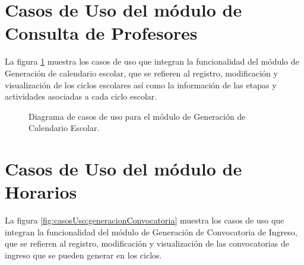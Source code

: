 \section{Casos de Uso del módulo de Consulta de Profesores}

La figura \ref{fig:casosUso:generacionCalendario} muestra los casos de uso que integran la funcionalidad del módulo de Generación de calendario escolar, que se refieren al registro, modificación y visualización de los ciclos escolares así como la información de las etapas y actividades asociadas a cada ciclo escolar.

\begin{figure}[h!]
	\begin{center}
		\caption{Diagrama de casos de uso para el módulo de Generación de Calendario Escolar. \label{fig:casosUso:generacionCalendario}}
	\end{center}
\end{figure}

\section{Casos de Uso del módulo de Horarios}

La figura \ref{fig:casosUso:generacionConvocatoria} muestra los casos de uso que integran la funcionalidad del módulo de Generación de Convocatoria de Ingreso, que se refieren al registro, modificación y visualización de las convocatorias de ingreso que se pueden generar en los ciclos.


